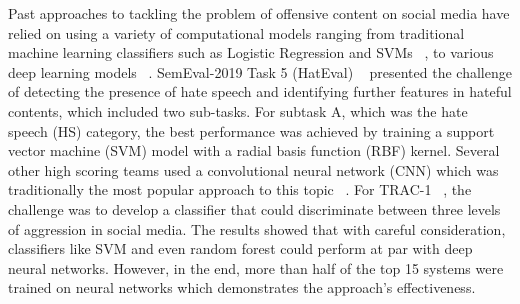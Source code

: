 \documentclass[11pt,a4paper]{article}
\begin{document}
Past approaches to tackling the problem of offensive content on social media have relied on using a variety of computational models ranging from traditional machine learning classifiers such as Logistic Regression and SVMs ~\cite{malmasi2018challenges}, to various deep learning models ~\cite{de-gibert-etal-2018-hate}. SemEval-2019 Task 5 (HatEval) ~\cite{basile2019semeval} presented the challenge of detecting the presence of hate speech and identifying further features in hateful contents, which included two sub-tasks. For subtask A, which was the hate speech (HS) category, the best performance was achieved by training a support vector machine (SVM) model with a radial basis function (RBF) kernel. Several other high scoring teams used a convolutional neural network (CNN) which was traditionally the most popular approach to this topic ~\cite{hettiarachchi-ranasinghe-2019-emoji}. For TRAC-1 ~\cite{kumar2018benchmarking}, the challenge was to develop a classifier that could discriminate between three levels of aggression in social media. The results showed that with careful consideration, classifiers like SVM and even random forest could perform at par with deep neural networks. However, in the end, more than half of the top 15 systems were trained on neural networks which demonstrates the approach's effectiveness.

\begin{table*}
\centering
\scalebox{0.92}{
\begin{tabular}{p{13cm}cccc@{}}
\toprule
\multicolumn{1}{c}{\textbf{Comment}} &
  \multicolumn{1}{c}{\textbf{Sub1}} &
  \multicolumn{1}{c}{\textbf{Sub2}} &
  \multicolumn{1}{c}{\textbf{Sub3}} \\ \midrule
"Die AfD sind genau so neoliberal und kapitalistische Zerstörer unserer Heimat, wie die CDU, CSU, FDP, SPD und Grüne auch." & 1 & 0 & 0 \\
"Sarazin ist ein rechtsradikaler Mensch. Ein Menschenhasser. Sie kennen nur Zerstörung. Die Geschichte hat es gezeigt."     & 1 & 0 & 1 \\
"@USER, du hast das Thema im Kern nicht verstanden"                                                                         & 0 & 0 & 1 \\
"Ich frage dich, verlassen Menschen gerne ihre Heimat?"                                                                     & 0 & 0 & 0 \\ \bottomrule
\end{tabular}}
\caption{Annotation examples of four different Facebook user comments. Sub1 represents toxic comments, Sub2 stands for engaging comments, and Sub3 stands for fact claiming.}
\label{tab:Annotation Examples}
\end{table*} 
\end{document}
